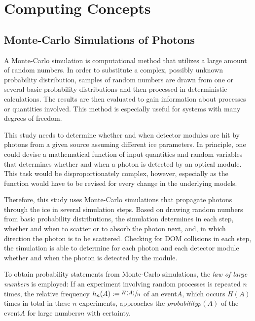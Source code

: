 
\section{Computing Concepts}
\label{sec:simulation_background}

\subsection{Monte-Carlo Simulations of Photons}
\label{sec:monte_carlo}


A Monte-Carlo simulation is computational method that utilizes a large amount of random numbers.
In order to substitute a complex, possibly unknown probability distribution, samples of random numbers are drawn from one or several basic probability distributions and then processed in deterministic calculations. The results are then evaluated to gain information about processes or quantities involved. This method is especially useful for systems with many degrees of freedom. \cite{physiklexikon}

This study needs to determine whether and when detector modules are hit by photons from a given source assuming different ice parameters. In principle, one could devise a mathematical function of input quantities and random variables that determines whether and when a photon is detected by an optical module. This task would be disproportionately complex, however, especially as the function would have to be revised for every change in the underlying models.

Therefore, this study uses Monte-Carlo simulations that propagate photons through the ice in several simulation steps. Based on drawing random numbers from basic probability distributions, the simulation determines in each step, whether and when to scatter or to absorb the photon next, and, in which direction the photon is to be scattered. Checking for DOM collisions in each step, the simulation is able to determine for each photon and each detector module whether and when the photon is detected by the module.

To obtain probability statements from Monte-Carlo simulations, the \textit{law of large numbers} is employed: If an experiment involving random processes is repeated $n$ times, the relative frequency $h_n(A):=\sfrac{H(A)}{n}$ of an event\nbsp $A$, which occurs $H(A)$ times in total in these $n$ experiments, approaches the \textit{probability}\nbsp $p(A)$ of the event\nbsp $A$ for large numbers\nbsp $n$ with certainty. \cite{physiklexikon}

